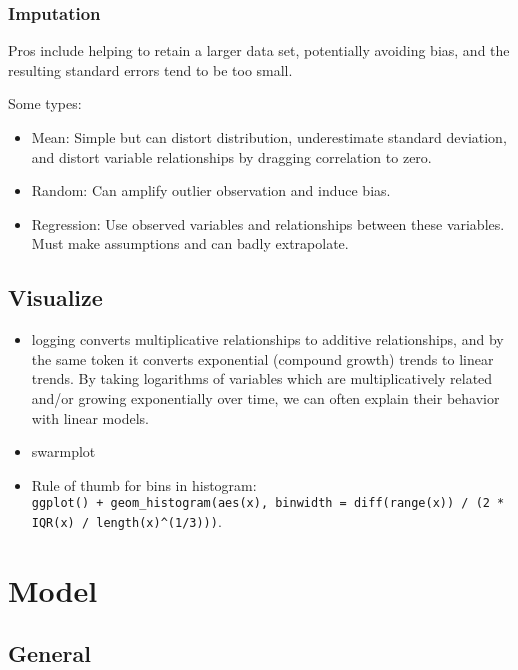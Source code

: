 \documentclass[]{book}
\theoremstyle{definition}
\theoremstyle{definition}
\theoremstyle{definition}
\theoremstyle{remark}
\begin{document}
\subsection{Imputation}\label{imputation}

Pros include helping to retain a larger data set, potentially avoiding
bias, and the resulting standard errors tend to be too small.

Some types:

\begin{itemize}
\item
  Mean: Simple but can distort distribution, underestimate standard
  deviation, and distort variable relationships by dragging correlation
  to zero.
\item
  Random: Can amplify outlier observation and induce bias.
\item
  Regression: Use observed variables and relationships between these
  variables. Must make assumptions and can badly extrapolate.
\end{itemize}

\section{Visualize}\label{visualize-1}

\begin{itemize}
\item
  logging converts multiplicative relationships to additive
  relationships, and by the same token it converts exponential (compound
  growth) trends to linear trends. By taking logarithms of variables
  which are multiplicatively related and/or growing exponentially over
  time, we can often explain their behavior with linear models.
\item
  swarmplot
\item
  Rule of thumb for bins in histogram:
  \texttt{ggplot()\ +\ geom\_histogram(aes(x),\ binwidth\ =\ diff(range(x))\ /\ (2\ *\ IQR(x)\ /\ length(x)\^{}(1/3)))}.
\end{itemize}

\chapter{Model}\label{model-1}

\section{General}\label{general-3}
\end{document}
